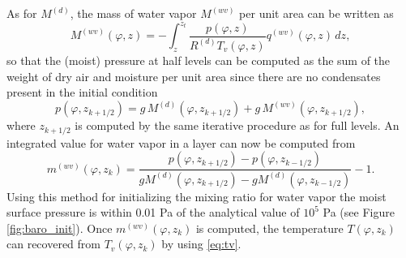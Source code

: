 \documentclass{agujournal}
\begin{document}
As for $M^{(d)}$, the mass of water vapor $M^{(wv)}$ per unit area can be written as
\begin{equation}
{M}^{(wv)}(\varphi,z)=-\int_z^{z_t}\frac{p(\varphi,z)}{R^{(d)} T_v(\varphi,z)}q^{(wv)}(\varphi,z)\, dz,\label{eq:Upvw}
\end{equation}
so that the (moist) pressure at half levels can be computed as the sum of the weight of dry air and moisture per unit area  since there are no condensates present in the initial condition
\begin{equation}
p(\varphi,z_{k+1/2})=g\, {M}^{(d)}(\varphi,z_{k+1/2})+g\, {M}^{(wv)}(\varphi,z_{k+1/2}),
\end{equation}
where $z_{k+1/2}$ is computed by the same iterative procedure as for full levels. An integrated value for water vapor in a layer can now be computed from
\begin{equation}
m^{(wv)}(\varphi,z_k)=\frac{p(\varphi,z_{k+1/2})-p(\varphi,z_{k-1/2})}{g{M}^{(d)}(\varphi,z_{k+1/2})-g{M}^{(d)}(\varphi,z_{k-1/2})}-1.
\end{equation}
Using this method for initializing the mixing ratio for water vapor the moist surface pressure is within 0.01 Pa of the analytical value of $10^5$ Pa (see Figure \ref{fig:baro_init}). Once $m^{(wv)}(\varphi,z_k)$ is computed, the temperature $T(\varphi,z_k)$ can recovered from $T_v(\varphi,z_k)$ by using \eqref{eq:tv}.
\end{document}
